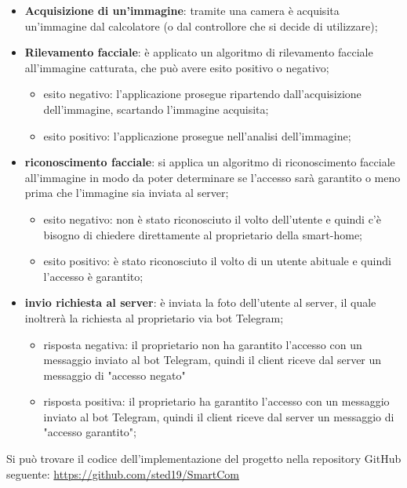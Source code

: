 \begin{itemize}
	\item \textbf{Acquisizione di un'immagine}: tramite una camera è acquisita un'immagine dal calcolatore (o dal controllore che si decide di utilizzare);
	\item \textbf{Rilevamento facciale}: è applicato un algoritmo di rilevamento facciale all'immagine catturata, che può avere esito positivo o negativo;
	\begin{itemize}
		\item esito negativo: l'applicazione prosegue ripartendo dall'acquisizione dell'immagine, scartando l'immagine acquisita;
		\item esito positivo: l'applicazione prosegue nell'analisi dell'immagine;
	\end{itemize}
	\item \textbf{riconoscimento facciale}: si applica un algoritmo di riconoscimento facciale all'immagine in modo da poter determinare se l'accesso sarà garantito o meno prima che l'immagine sia inviata al server;
	\begin{itemize}
		\item esito negativo: non è stato riconosciuto il volto dell'utente e quindi c'è bisogno di chiedere direttamente al proprietario della smart-home;
		\item esito positivo: è stato riconosciuto il volto di un utente abituale e quindi l'accesso è garantito;
	\end{itemize}
	\item \textbf{invio richiesta al server}: è inviata la foto dell'utente al server, il quale inoltrerà la richiesta al proprietario via bot Telegram;
	\begin{itemize}
		\item risposta negativa: il proprietario non ha garantito l'accesso con un messaggio inviato al bot Telegram, quindi il client riceve dal server un messaggio di "accesso negato"
		\item risposta positiva: il proprietario ha garantito l'accesso con un messaggio inviato al bot Telegram, quindi il client riceve dal server un messaggio di "accesso garantito";
	\end{itemize}
\end{itemize}
Si può trovare il codice dell'implementazione del progetto nella repository GitHub seguente: \href{https://github.com/sted19/SmartCom}{https://github.com/sted19/SmartCom}



